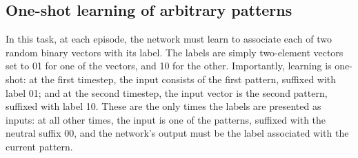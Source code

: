 \documentclass{article}
\begin{document}
\subsection{One-shot learning of arbitrary patterns}



In this task, at each episode, the network must learn to associate each of two
random binary vectors with its label. The labels are simply two-element vectors
set to 01 for one of the
vectors, and 10 for the other. Importantly, learning is one-shot: at the first
timestep, the input consists of the first pattern, suffixed with label 01;
and at the second timestep, the input vector is the second pattern, suffixed
with label 10. These are the only times the labels are presented as inputs: at
all other times, the input is one of the patterns, suffixed with the neutral
suffix 00, and the network's output must be the label associated with the current
pattern.
\end{document}
